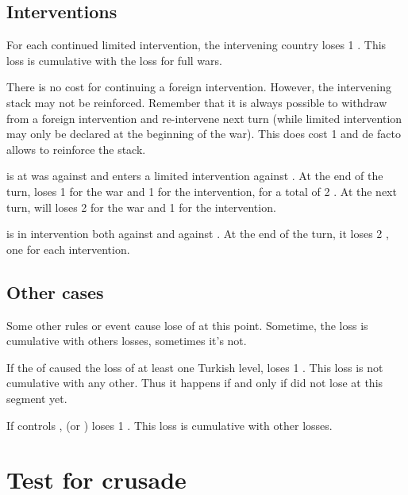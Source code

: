 \subsection{Interventions}
\bparag For each continued limited intervention, the intervening country loses
1 \STAB.
\bparag This loss is cumulative with the loss for full wars.

\bparag There is no cost for continuing a foreign intervention. However, the
intervening stack may not be reinforced.
\bparag Remember that it is always possible to withdraw from a foreign
intervention and re-intervene next turn (while limited intervention may only
be declared at the beginning of the war). This does cost 1 \STAB and de facto
allows to reinforce the stack.

\begin{exemple}[Interventions]
  \FRA is at was against \HIS and enters a limited intervention against
  \ANG. At the end of the turn, \FRA loses 1 \STAB for the war and 1 for the
  intervention, for a total of 2 \STAB. At the next turn, \FRA will loses
  2 \STAB for the war and 1 for the intervention.

  \ANG is in intervention both against \FRA and against \AUS. At the end of
  the turn, it loses 2 \STAB, one for each intervention.
\end{exemple}

\subsection{Other cases}
\aparag Some other rules or event cause lose of \STAB at this point.
\bparag Sometime, the loss is cumulative with others losses, sometimes it's
not. 

\bparag If the \corsaire of \paysChevaliers caused the loss of at least one
Turkish \TradeFLEET level, \TUR loses 1 \STAB.
\bparag This loss is not cumulative with any other. Thus it happens if and
only if \TUR did not lose \STAB at this segment yet.

\aparag[\villeVienne]
\bparag If \TUR controls \villeVienne, \HAB (\SPA or \AUS) loses 1 \STAB.
\bparag This loss is cumulative with other losses.

\section{Test for crusade}\label{chPeace:Crusade}


